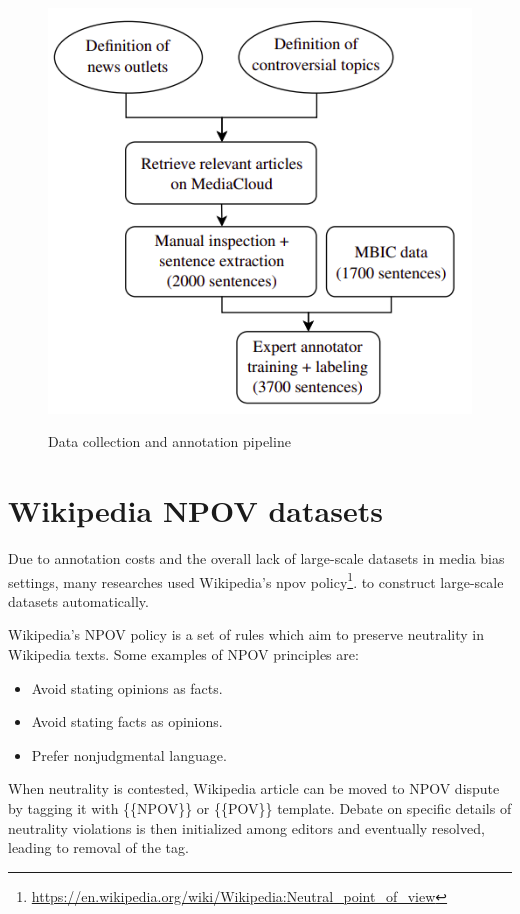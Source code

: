 \begin{figure}
  \includegraphics[width=\linewidth]{my_modules/multimedia/babe.png}
  \caption{Data collection and annotation pipeline}
  \label{fig:babe-data}
  \cite{Spinde2021f}
\end{figure}

\section{Wikipedia NPOV datasets}\label{wiki-npov}
Due to annotation costs and the overall lack of large-scale datasets in media bias settings, many researches \cite{pryzant2020automatically,recasens2013linguistic,hube2019neural} used Wikipedia's \Gls{npov} policy\footnote{\url{https://en.wikipedia.org/wiki/Wikipedia:Neutral_point_of_view}}. to construct large-scale datasets automatically. 

Wikipedia's NPOV policy is a set of rules which aim to preserve neutrality in Wikipedia texts. Some examples of NPOV principles are:
\begin{itemize}
    \item Avoid stating opinions as facts.
    \item Avoid stating facts as opinions.
    \item Prefer nonjudgmental language.
\end{itemize}
When neutrality is contested, Wikipedia article can be moved to NPOV dispute by tagging it with \{\{NPOV\}\} or \{\{POV\}\} template. Debate on specific details of neutrality violations is then initialized among editors and eventually resolved, leading to removal of the tag.

